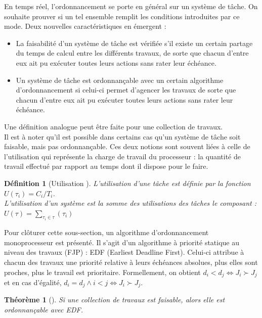 \documentclass[12pt,a4paper,oneside]{book}
\theoremstyle{break}
\newtheorem{defin}{Définition}[chapter]
\theoremstyle{breakplain}
\newtheorem{theo}{Théorème}[chapter]
\begin{document}
En temps réel, l'ordonnancement se porte en général sur un système de tâche. On souhaite prouver si un tel ensemble remplit les conditions introduites par ce mode. Deux nouvelles caractéristiques en émergent \cite{goossens2014os} :

\begin{itemize}
\item La faisabilité d'un système de tâche est vérifiée s'il existe un certain partage du temps de calcul entre les différents travaux, de sorte que chacun d'entre eux ait pu exécuter toutes leurs actions sans rater leur échéance.
\item Un système de tâche est ordonnançable avec un certain algorithme d'ordonnancement si celui-ci permet d'agencer les travaux de sorte que chacun d'entre eux ait pu exécuter toutes leurs actions sans rater leur échéance.\\
\end{itemize}

Une définition analogue peut être faite pour une collection de travaux.\\

Il est à noter qu'il est possible dans certains cas qu'un système de tâche soit faisable, mais pas ordonnançable. Ces deux notions sont souvent liées à celle de l'utilisation qui représente la charge de travail du processeur : la quantité de travail effectué par rapport au temps dont il dispose pour le faire.

\begin{defin}[Utilisation \cite{goossens2014os}]
L'utilisation d'une tâche est définie par la fonction $U(\tau_i) = C_i/T_i$.\\
L'utilisation d'un système est la somme des utilisations des tâches le composant : $U(\tau) = \underset{\tau_i \in \tau}{\sum} (\tau_i)$
\end{defin}

Pour clôturer cette sous-section, un algorithme d'ordonnancement monoprocesseur est présenté. Il s'agit d'un algorithme à priorité statique au niveau des travaux (FJP) : EDF (Earliest Deadline First). Celui-ci attribue à chacun des travaux une priorité relative à leurs échéances absolues, plus elles sont proches, plus le travail est prioritaire. Formellement, on obtient $d_i < d_j \Leftrightarrow J_i \succ J_j$ et en cas d'égalité, $d_i = d_j \wedge i < j \Leftrightarrow J_i \succ J_j$.

\begin{theo}[\cite{goossens2014os}]
Si une collection de travaux est faisable, alors elle est ordonnançable avec EDF.
\end{theo}
\end{document}
